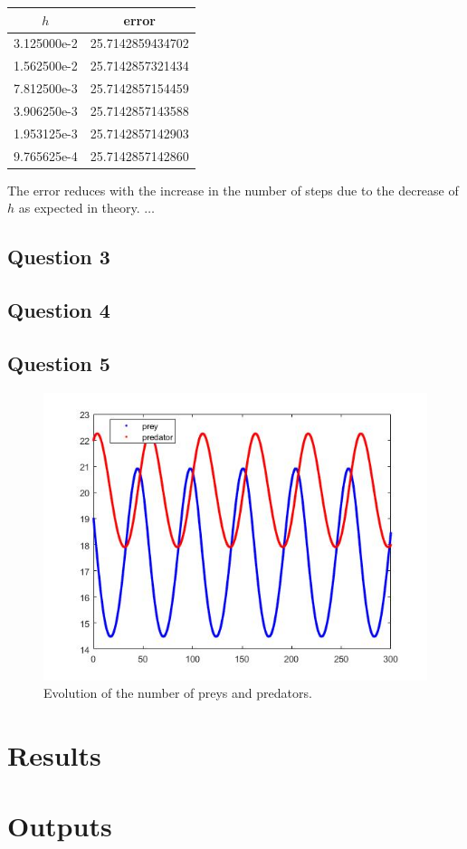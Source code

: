 \documentclass[a4paper, 11pt]{article}
\begin{document}
			\begin{table}[H]
				\centering
				\begin{tabular}{c|c}
					\textbf{$h$}& \textbf{error}   \\ \hline
					3.125000e-2 & 25.7142859434702 \\ \hline
					1.562500e-2 & 25.7142857321434 \\ \hline
					7.812500e-3 & 25.7142857154459 \\ \hline
					3.906250e-3 & 25.7142857143588 \\ \hline
					1.953125e-3 & 25.7142857142903 \\ \hline
					9.765625e-4 & 25.7142857142860 \\ \hline
				\end{tabular}
			\end{table}
		
		The error reduces with the increase in the number of steps due to the decrease of $h$ as expected in theory. $\ldots$		
		
		\subsection*{Question 3}
			
		\subsection*{Question 4}
			
		\subsection*{Question 5}
			\begin{figure}[H]
				\centering
				\includegraphics[width=\linewidth]{ex5.jpg}
				\caption{Evolution of the number of preys and predators.}
				\label{fig:ex5}
			\end{figure}
			
			
			
	
	
	\section*{Results}

	
	\section*{Outputs}
	
	
	
\end{document}
